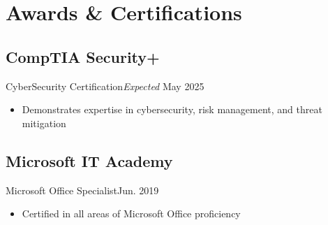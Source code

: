 \section{Awards \& Certifications}
\subsection{CompTIA Security+}{CyberSecurity Certification}{}{\textit{Expected} May 2025}
\begin{itemize}
    \item Demonstrates expertise in cybersecurity, risk management, and threat mitigation

\end{itemize}


\subsection{Microsoft IT Academy}{Microsoft Office Specialist}{}{Jun. 2019}
\begin{itemize}
    \item Certified in all areas of Microsoft Office proficiency
\end{itemize}

